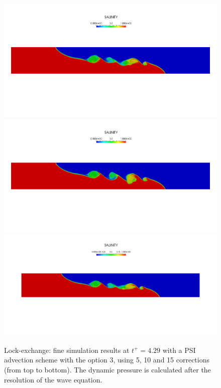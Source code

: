 \begin{figure}[ht]
  \begin{center}
    \includegraphics[scale=0.25, trim=35 300 0 300, clip]{./img/lock-exchange_0,025_80p_PSI3_5corr.png}
    \includegraphics[scale=0.25, trim=35 300 0 300, clip]{./img/lock-exchange_0,025_80p_PSI3_10corr.png}
    \includegraphics[scale=0.25, trim=35 300 0 300, clip]{./img/lock-exchange_0,025_80p_PSI3_15corr.png}
    \caption{Lock-exchange: fine simulation results at $t^+=4.29$ with a PSI advection scheme
      with the option 3, using 5, 10 and 15 corrections (from top to bottom).
      The dynamic pressure is calculated after the resolution of the wave equation.}
    \label{fig:fine_sim}
  \end{center}
\end{figure}
